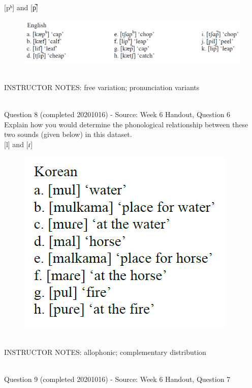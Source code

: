 \documentclass[12pt]{article}
\begin{document}
{[pʰ]} and {[p̚]}

\begin{figure}[H]
\includegraphics{../images/english_labials.png}
\end{figure}

~\\
INSTRUCTOR NOTES: free variation; pronunciation variants


~\\

{\large Question 8} (completed 20201016) - Source: Week 6 Handout, Question 6\\

Explain how you would determine the phonological relationship between these two sounds (given below) in this dataset.\\

{[l]} and {[ɾ]}

\begin{figure}[H]
\includegraphics{../images/korean.png}
\end{figure}

~\\
INSTRUCTOR NOTES: allophonic; complementary distribution


~\\

{\large Question 9} (completed 20201016) - Source: Week 6 Handout, Question 7\\
\end{document}
